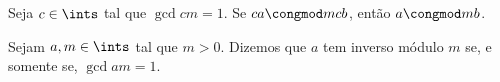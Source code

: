 \begin{exercise}
  Seja $c \in \ints$ tal que $\gcd c m = 1$. Se $ca \congmod m {cb}$, ent\~ao
  $a \congmod m b$.
\end{exercise}

\begin{homework}
  Sejam $a,m \in \ints$ tal que $m > 0$. Dizemos que $a$ tem inverso m\'odulo
  $m$ se, e somente se, $\gcd a m = 1$.
\end{homework}
